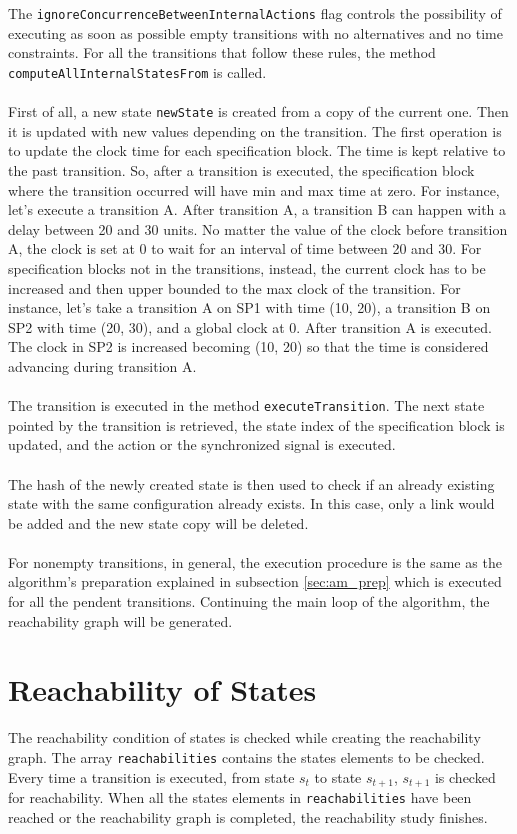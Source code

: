 \documentclass[12pt]{article}
\begin{document}
The \texttt{ignoreConcurrenceBetweenInternalActions} flag controls the possibility of executing as soon as possible empty transitions with no alternatives and no time constraints. For all the transitions that follow these rules, the method \texttt{computeAllInternalStatesFrom} is called.
\\\\
First of all, a new state \texttt{newState} is created from a copy of the current one. Then it is updated with new values depending on the transition. The first operation is to update the clock time for each specification block. The time is kept relative to the past transition. So, after a transition is executed, the specification block where the transition occurred will have min and max time at zero. For instance, let's execute a transition A. After transition A, a transition B can happen with a delay between 20 and 30 units. No matter the value of the clock before transition A, the clock is set at 0 to wait for an interval of time between 20 and 30. For specification blocks not in the transitions, instead, the current clock has to be increased and then upper bounded to the max clock of the transition. For instance, let's take a transition A on SP1 with time (10, 20), a transition B on SP2 with time (20, 30), and a global clock at 0. After transition A is executed. The clock in SP2 is increased becoming (10, 20) so that the time is considered advancing during transition A.
\\\\
The transition is executed in the method \texttt{executeTransition}. The next state pointed by the transition is retrieved, the state index of the specification block is updated, and the action or the synchronized signal is executed.
\\\\
The hash of the newly created state is then used to check if an already existing state with the same configuration already exists. In this case, only a link would be added and the new state copy will be deleted.
\\\\
For nonempty transitions, in general, the execution procedure is the same as the algorithm's preparation explained in subsection \ref{sec:am_prep} which is executed for all the pendent transitions. Continuing the main loop of the algorithm, the reachability graph will be generated.


\section{Reachability of States}
The reachability condition of states is checked while creating the reachability graph. The array \texttt{reachabilities} contains the states elements to be checked. Every time a transition is executed, from state $s_t$ to state $s_{t+1}$, $s_{t+1}$ is checked for reachability. When all the states elements in \texttt{reachabilities} have been reached or the reachability graph is completed, the reachability study finishes.
\end{document}
